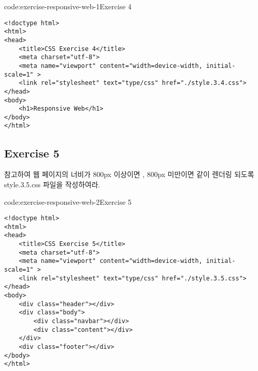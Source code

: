 \begin{codeenv}{code:exercise-responsive-web-1}{Exercise 4}\begin{verbatim}
<!doctype html>
<html>
<head>
    <title>CSS Exercise 4</title>
    <meta charset="utf-8">
    <meta name="viewport" content="width=device-width, initial-scale=1" >
    <link rel="stylesheet" text="type/css" href="./style.3.4.css">
</head>
<body>
    <h1>Responsive Web</h1>
</body>
</html>
\end{verbatim}
\end{codeenv}

\subsection*{Exercise 5}
\를 참고하여 웹 페이지의 너비가 800px 이상이면 , 800px 미만이면 \과 같이 렌더링 되도록 style.3.5.css 파일을 작성하여라.

\begin{codeenv}{code:exercise-responsive-web-2}{Exercise 5}\begin{verbatim}
<!doctype html>
<html>
<head>
    <title>CSS Exercise 5</title>
    <meta charset="utf-8">
    <meta name="viewport" content="width=device-width, initial-scale=1" >
    <link rel="stylesheet" text="type/css" href="./style.3.5.css">
</head>
<body>
    <div class="header"></div>
    <div class="body">
        <div class="navbar"></div>
        <div class="content"></div>
    </div>
    <div class="footer"></div>
</body>
</html>
\end{verbatim}
\end{codeenv}


